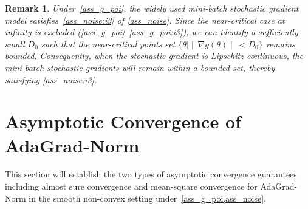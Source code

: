 \documentclass[standalone]{article}
\newtheorem{rem}{Remark}
\begin{document}
\begin{rem}
Under~\cref{ass_g_poi}, the widely used mini-batch stochastic gradient model  satisfies~\cref{ass_noise:i3} of \cref{ass_noise}. Since the near-critical case at infinity is excluded (\cref{ass_g_poi}~\ref{ass_g_poi:i3}), we can identify a sufficiently small $D_0$ such that the near-critical points set $\{\theta \mid \|\nabla g(\theta)\|<D_0\}$ remains bounded. Consequently, when the stochastic gradient is Lipschitz continuous, the mini-batch stochastic gradients will remain within a bounded set, thereby satisfying \cref{ass_noise:i3}.
\end{rem}  



\section{Asymptotic Convergence of AdaGrad-Norm}
\label{sec:asympt:result}
This section will establish the two types of asymptotic convergence guarantees including almost sure convergence and mean-square convergence for AdaGrad-Norm in the smooth non-convex setting under~\cref{ass_g_poi,ass_noise}. 
\end{document}
